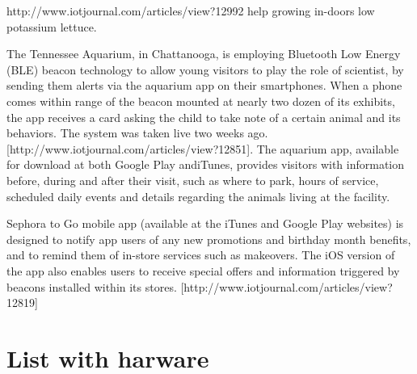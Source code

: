\documentclass[12pt]{article}
\begin{document}
http://www.iotjournal.com/articles/view?12992 help growing in-doors low potassium lettuce.




 The Tennessee Aquarium, in Chattanooga, is employing Bluetooth Low Energy (BLE) beacon technology to allow young visitors to play the role of scientist, by sending them alerts via the aquarium app on their smartphones. When a phone comes within range of the beacon mounted at nearly two dozen of its exhibits, the app receives a card asking the child to take note of a certain animal and its behaviors. The system was taken live two weeks ago. [http://www.iotjournal.com/articles/view?12851]. The aquarium app, available for download at both Google Play andiTunes, provides visitors with information before, during and after their visit, such as where to park, hours of service, scheduled daily events and details regarding the animals living at the facility.



Sephora to Go mobile app (available at the iTunes and Google Play websites) is designed to notify app users of any new promotions and birthday month benefits, and to remind them of in-store services such as makeovers. The iOS version of the app also enables users to receive special offers and information triggered by beacons installed within its stores. [http://www.iotjournal.com/articles/view?12819]
 \section {List with harware}



\end{document}
